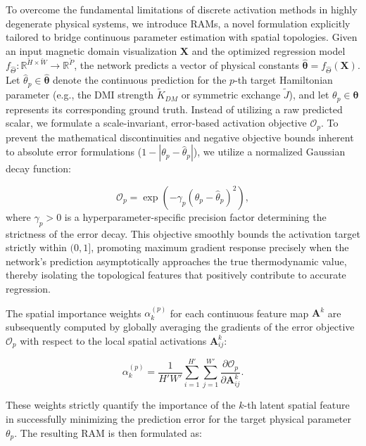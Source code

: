 \documentclass[final,5p,times,twocolumn]{elsarticle}
\begin{document}
To overcome the fundamental limitations of discrete activation methods in highly degenerate physical systems, we introduce RAMs, a novel formulation explicitly tailored to bridge continuous parameter estimation with spatial topologies. Given an input magnetic domain visualization $\mathbf{X}$ and the optimized regression model $f_{\hat{\Theta}} : \mathbb{R}^{\breve{H} \times \breve{W}} \rightarrow \mathbb{R}^{\breve{P}}$, the network predicts a vector of physical constants $\hat{\boldsymbol{\theta}} = f_{\hat{\Theta}}(\mathbf{X})$. Let $\hat{\theta}_p \in \hat{\boldsymbol{\theta}}$ denote the continuous prediction for the $p$-th target Hamiltonian parameter (e.g., the DMI strength $\tilde{K}_{DM}$ or symmetric exchange $\tilde{J}$), and let $\theta_p \in \boldsymbol{\theta}$ represents its corresponding ground truth. Instead of utilizing a raw predicted scalar, we formulate a scale-invariant, error-based activation objective $\mathcal{O}_p$. To prevent the mathematical discontinuities and negative objective bounds inherent to absolute error formulations ($1 - |\theta_p - \hat{\theta}_p|$), we utilize a normalized Gaussian decay function:

\begin{equation}\label{eq:RAM_Objective}
\mathcal{O}_p = \exp\left(-\gamma_p \left(\theta_p - \hat{\theta}_p\right)^2\right),
\end{equation}
where $\gamma_p>0$ is a hyperparameter-specific precision factor determining the strictness of the error decay. This objective smoothly bounds the activation target strictly within $(0, 1]$, promoting maximum gradient response precisely when the network's prediction asymptotically approaches the true thermodynamic value, thereby isolating the topological features that positively contribute to accurate regression.

The spatial importance weights $\alpha_k^{(p)}$ for each continuous feature map $\mathbf{A}^k$ are subsequently computed by globally averaging the gradients of the error objective $\mathcal{O}_p$ with respect to the local spatial activations $\mathbf{A}_{ij}^k$:

\begin{equation}\label{eq:RAM_Weights}
\alpha_k^{(p)} = \frac{1}{H' W'} \sum_{i=1}^{H'} \sum_{j=1}^{W'} \frac{\partial \mathcal{O}_p}{\partial \mathbf{A}_{ij}^k}.
\end{equation}

These weights strictly quantify the importance of the $k$-th latent spatial feature in successfully minimizing the prediction error for the target physical parameter $\theta_p$. The resulting RAM is then formulated as:
\end{document}
